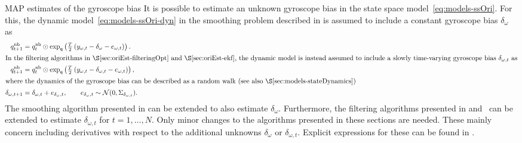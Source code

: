 \begin{myexample}{MAP estimates of the gyroscope bias}%
\label{ex:calibration-gyrBias-map}%
It is possible to estimate an unknown gyroscope bias in the state space model~\eqref{eq:models-ssOri}. For this, the dynamic model~\eqref{eq:models-ssOri-dyn} in the smoothing problem described in  is assumed to include a constant gyroscope bias $\delta_\omega$ as
\begin{subequations}
\begin{align}
q^\text{nb}_{t+1} &= q^\text{nb}_t \odot \expq \left( \tfrac{T}{2} \left( y_{\omega,t} - \delta_\omega - e_{\omega,t} \right) \right). \\
\intertext{In the filtering algorithms in \Sectionref{sec:oriEst-filteringOpt} and~\Sectionref{sec:oriEst-ekf}, the dynamic model is instead assumed to include a slowly time-varying gyroscope bias $\delta_{\omega,t}$ as}
q^\text{nb}_{t+1} &= q^\text{nb}_t \odot \expq \left( \tfrac{T}{2} \left( y_{\omega,t} - \delta_{\omega,t} - e_{\omega,t} \right) \right), \\
\intertext{where the dynamics of the gyroscope bias can be described as a random walk (see also \Sectionref{sec:models-stateDynamics})}
\delta_{\omega,t+1} &= \delta_{\omega,t} + e_{\delta_\omega,t}, \qquad e_{\delta_\omega,t} \sim \mathcal{N}(0,\Sigma_{\delta_{\omega,t}} ). \label{eq:calibration-randWalkGyrBias}
\end{align}
\end{subequations}
The smoothing algorithm presented in  can be extended to also estimate $\delta_\omega$. Furthermore, the filtering algorithms presented in  and~ can be extended to estimate $\delta_{\omega,t}$ for $t = 1, \hdots, N$. Only minor changes to the algorithms presented in these sections are needed. These mainly concern including derivatives with respect to the additional unknowns $\delta_{\omega}$ or $\delta_{\omega,t}$. Explicit expressions for these can be found in . 
\end{myexample}

